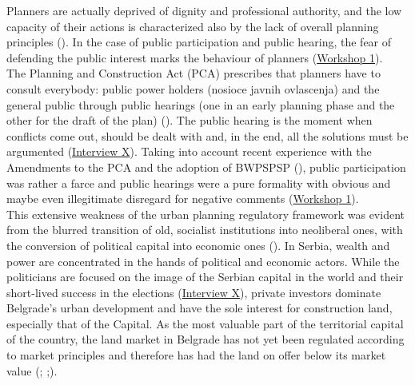 \documentclass[11pt]{report}
\begin{document}
{{{{Planners are  actually deprived of dignity and professional authority, and the low capacity of their actions is characterized also by the lack of overall planning principles (\href{ref}{\citealt{petrovic_cities_2009}}).
In the case of public participation and public hearing, the fear of defending the public interest marks the behaviour of planners (\href{Expert Workshop}{Workshop 1}).
\\

The Planning and Construction Act (PCA) prescribes that planners have to consult everybody: public power holders (nosioce javnih ovlascenja) and the general public through public hearings (one in an early planning phase and the other for the draft of the plan) (\cite{PCA}).
The public hearing is the moment when conflicts come out, should be dealt with and, in the end, all the solutions must be argumented (\href{InterviewX}{Interview X}).
Taking into account recent experience with the Amendments to the PCA and the adoption of BWPSPSP (\cite{ref media all different}), public participation was rather a farce and public hearings were a pure formality with obvious and maybe even illegitimate disregard for negative comments (\href{Expert Workshop}{Workshop 1}).
\\ 

This extensive weakness of the urban planning regulatory framework was evident from the blurred transition of old, socialist institutions into neoliberal ones, with the conversion of political capital into economic ones (\href{ref}{\citealt{vujovic_belgrades_2007}}).
In Serbia, wealth and power are concentrated in the hands of political and economic actors. While the politicians are focused on the image of the Serbian capital in the world and their short-lived success in the elections (\href{InterviewX}{Interview X}),
private investors dominate Belgrade's urban development and have the sole interest for construction land, especially that of the Capital. As the most valuable part of the territorial capital of the country, the land market in Belgrade has not yet been regulated according to market principles and therefore has had the land on offer below its market value (\href{SKGO2013}{\citealt{skgo_finansiranje_2013}}; \href{Zekovic}{\citealt{zekovic_planning_2015}};\href{Zekovic}{\citealt{zekovic_megaprojects_2016}}).
    
}}}}
\end{document}
